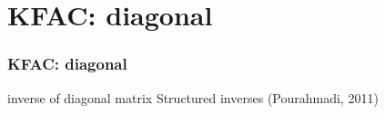 \section{KFAC: diagonal}

\begin{frame}
\frametitle{KFAC: diagonal}
inverse of diagonal matrix
Structured inverses (Pourahmadi, 2011)

\end{frame}
